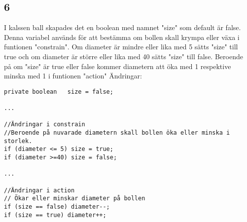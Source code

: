 \documentclass[hidelinks]{article}
\begin{document}
\newpage
\subsection*{6}
I kalssen ball skapades det en boolean med namnet "size" som default är false. Denna variabel används för att bestämma om bollen skall krympa eller växa i funtionen "constrain". Om diameter är mindre eller lika med 5 sätts "size" till true och om diameter är större eller lika med 40 sätts "size" till false. Beroende på om "size" är true eller false kommer diametern att öka med 1 respektive minska med 1 i funtionen "action"
Ändringar:
\begin{verbatim}
private boolean   size = false;

...

//Ändringar i constrain
//Beroende på nuvarade diametern skall bollen öka eller minska i storlek.
if (diameter <= 5) size = true;
if (diameter >=40) size = false;

...

//Ändringar i action
// Ökar eller minskar diameter på bollen
if (size == false) diameter--;
if (size == true) diameter++;
\end{verbatim}
\end{document}

